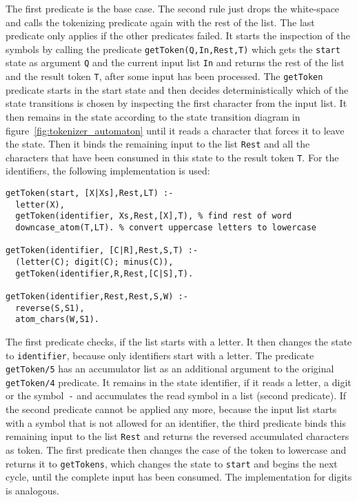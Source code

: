 The first predicate is the base case. The second rule just drops the white-space and calls the tokenizing predicate again with the rest of the list. The last predicate only applies if the other predicates failed. It starts the inspection of the symbols by calling the predicate \lstinline|getToken(Q,In,Rest,T)| which gets the \lstinline|start| state as argument \lstinline|Q| and the current input list \lstinline|In| and returns the rest of the list and the result token \lstinline|T|, after some input has been processed. The \lstinline|getToken| predicate starts in the start state and then decides deterministically which of the state transitions is chosen by inspecting the first character from the input list. It then remains in the state according to the state transition diagram in figure~\ref{fig:tokenizer_automaton} until it reads a character that forces it to leave the state. Then it binds the remaining input to the list \lstinline|Rest| and all the characters that have been consumed in this state to the result token \lstinline|T|. For the identifiers, the following implementation is used:

\begin{lstlisting}
getToken(start, [X|Xs],Rest,LT) :-
  letter(X), 
  getToken(identifier, Xs,Rest,[X],T), % find rest of word
  downcase_atom(T,LT). % convert uppercase letters to lowercase
  
getToken(identifier, [C|R],Rest,S,T) :-
  (letter(C); digit(C); minus(C)), 
  getToken(identifier,R,Rest,[C|S],T).
  
getToken(identifier,Rest,Rest,S,W) :-
  reverse(S,S1),
  atom_chars(W,S1). 
\end{lstlisting}

The first predicate checks, if the list starts with a letter. It then changes the state to \lstinline|identifier|, because only identifiers start with a letter. The predicate \lstinline|getToken/5| has an accumulator list as an additional argument to the original \lstinline|getToken/4| predicate. It remains in the state identifier, if it reads a letter, a digit or the symbol~\lstinline|-| and accumulates the read symbol in a list (second predicate). If the second predicate cannot be applied any more, because the input list starts with a symbol that is not allowed for an identifier, the third predicate binds this remaining input to the list \lstinline|Rest| and returns the reversed accumulated characters as token. The first predicate then changes the case of the token to lowercase and returns it to \lstinline|getTokens|, which changes the state to \lstinline|start| and begins the next cycle, until the complete input has been consumed. The implementation for digits is analogous.

